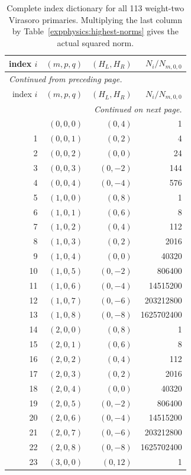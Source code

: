 \begingroup\small
\setlength{\tabcolsep}{5pt}
\begin{longtable}{rrrr}
\caption{Complete index dictionary for all 113 weight-two Virasoro primaries. Multiplying the last column by Table~\ref{expphysics:highest-norms} gives the actual squared norm.}\label{expphysics:basis-dictionary}\\
\toprule
index $i$ & $(m,p,q)$ & $(H_L,H_R)$ & $N_i/N_{m,0,0}$\\
\midrule
\endfirsthead
\multicolumn{4}{l}{\small\itshape Continued from preceding page.}\\
\toprule
index $i$ & $(m,p,q)$ & $(H_L,H_R)$ & $N_i/N_{m,0,0}$\\
\midrule
\endhead
\midrule
\multicolumn{4}{r}{\small\itshape Continued on next page.}\\
\endfoot
\bottomrule
\endlastfoot
0 & $(0,0,0)$ & $(0,4)$ & 1\\
1 & $(0,0,1)$ & $(0,2)$ & 4\\
2 & $(0,0,2)$ & $(0,0)$ & 24\\
3 & $(0,0,3)$ & $(0,-2)$ & 144\\
4 & $(0,0,4)$ & $(0,-4)$ & 576\\
5 & $(1,0,0)$ & $(0,8)$ & 1\\
6 & $(1,0,1)$ & $(0,6)$ & 8\\
7 & $(1,0,2)$ & $(0,4)$ & 112\\
8 & $(1,0,3)$ & $(0,2)$ & 2016\\
9 & $(1,0,4)$ & $(0,0)$ & 40320\\
10 & $(1,0,5)$ & $(0,-2)$ & 806400\\
11 & $(1,0,6)$ & $(0,-4)$ & 14515200\\
12 & $(1,0,7)$ & $(0,-6)$ & 203212800\\
13 & $(1,0,8)$ & $(0,-8)$ & 1625702400\\
14 & $(2,0,0)$ & $(0,8)$ & 1\\
15 & $(2,0,1)$ & $(0,6)$ & 8\\
16 & $(2,0,2)$ & $(0,4)$ & 112\\
17 & $(2,0,3)$ & $(0,2)$ & 2016\\
18 & $(2,0,4)$ & $(0,0)$ & 40320\\
19 & $(2,0,5)$ & $(0,-2)$ & 806400\\
20 & $(2,0,6)$ & $(0,-4)$ & 14515200\\
21 & $(2,0,7)$ & $(0,-6)$ & 203212800\\
22 & $(2,0,8)$ & $(0,-8)$ & 1625702400\\
23 & $(3,0,0)$ & $(0,12)$ & 1\\

\end{longtable}
